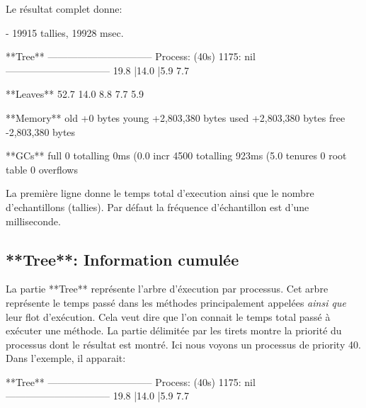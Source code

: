 \documentclass[a4paper,10pt,twoside]{book}
\begin{document}
Le r\'esultat complet donne:
\begin{footnotesize}
\begin{sf}
 - 19915 tallies, 19928 msec.

**Tree**
--------------------------------
Process: (40s)  1175: nil
--------------------------------
19.8%
  |14.0%
  |5.9%
7.7%

**Leaves**
52.7%
14.0%
8.8%
7.7%
5.9%

**Memory**
	old			+0 bytes
	young		+2,803,380 bytes
	used		+2,803,380 bytes
	free		-2,803,380 bytes

**GCs**
	full			0 totalling 0ms (0.0%
	incr		4500 totalling 923ms (5.0%
	tenures		0
	root table	0 overflows
\end{sf}
\end{footnotesize}

La premi\`ere ligne donne le temps total d'execution ainsi que le
nombre d'echantillons (tallies). Par d\'efaut la fr\'equence
d'\'echantillon est d'une milliseconde. 

 \subsection{**Tree**: Information cumul\'ee}

 La partie **Tree** repr\'esente l'arbre d'\'execution par
 processus. Cet arbre repr\'esente le temps pass\'e dans les
 m\'ethodes principalement appel\'ees \emph{ainsi que} leur flot
 d'ex\'ecution. Cela veut dire que l'on connait le temps total pass\'e
 \`a ex\'ecuter une m\'ethode. La partie d\'elimit\'ee par les tirets
 montre la priorit\'e du processus dont le r\'esultat est
 montr\'e. Ici nous voyons un processus de priority 40.  Dans
 l'exemple, il apparait:

\begin{sf}
\begin{small}
**Tree**
--------------------------------
Process: (40s)  1175: nil
--------------------------------
19.8%
  |14.0%
  |5.9%
7.7%
\end{small}
\end{sf}
\end{document}
